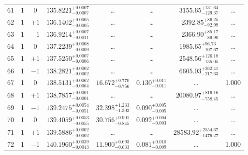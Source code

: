 \begin{table*}[!]
\begin{tabular}{llcrrlrc}
61 & 1 & 0 & $    135.8221_{-      0.0007}^{+      0.0007}$ & \multicolumn{1}{c}{\dots} & \multicolumn{1}{c}{\dots} & $     3155.65_{-      129.37}^{+      131.64}$ & \dots \\[1pt]
62 & 1 & $+1$ & $    136.1402_{-      0.0005}^{+      0.0005}$ & \multicolumn{1}{c}{\dots} & \multicolumn{1}{c}{\dots} & $     2392.85_{-       92.99}^{+       86.25}$ & \dots \\[1pt]
63 & 1 & $-1$ & $    136.9214_{-      0.0011}^{+      0.0007}$ & \multicolumn{1}{c}{\dots} & \multicolumn{1}{c}{\dots} & $     2366.90_{-       89.90}^{+       85.17}$ & \dots \\[1pt]
64 & 1 & 0 & $    137.2239_{-      0.0009}^{+      0.0008}$ & \multicolumn{1}{c}{\dots} & \multicolumn{1}{c}{\dots} & $     1985.65_{-      107.67}^{+       96.73}$ & \dots \\[1pt]
65 & 1 & $+1$ & $    137.5250_{-      0.0006}^{+      0.0007}$ & \multicolumn{1}{c}{\dots} & \multicolumn{1}{c}{\dots} & $     2548.56_{-      135.05}^{+      126.18}$ & \dots \\[1pt]
66 & 1 & $-1$ & $    138.2821_{-      0.0002}^{+      0.0002}$ & \multicolumn{1}{c}{\dots} & \multicolumn{1}{c}{\dots} & $     6605.03_{-      217.63}^{+      262.41}$ & \dots \\[1pt]
67 & 1 & 0 & $    138.5131_{-      0.0064}^{+      0.0062}$ & $      16.672_{-       0.756}^{+       0.770}$ & $       0.130_{-       0.011}^{+       0.011}$ & \multicolumn{1}{c}{\dots} & 1.000\\[1pt]
68 & 1 & $+1$ & $    138.7857_{-      0.0001}^{+      0.0001}$ & \multicolumn{1}{c}{\dots} & \multicolumn{1}{c}{\dots} & $    20080.97_{-      758.45}^{+      816.16}$ & \dots \\[1pt]
69 & 1 & $-1$ & $    139.2475_{-      0.0051}^{+      0.0054}$ & $      32.398_{-       1.303}^{+       1.233}$ & $       0.090_{-       0.005}^{+       0.005}$ & \multicolumn{1}{c}{\dots} & \dots \\[1pt]
70 & 1 & 0 & $    139.4059_{-      0.0055}^{+      0.0053}$ & $      30.756_{-       0.845}^{+       0.901}$ & $       0.092_{-       0.003}^{+       0.004}$ & \multicolumn{1}{c}{\dots} & \dots \\[1pt]
71 & 1 & $+1$ & $    139.5886_{-      0.0002}^{+      0.0002}$ & \multicolumn{1}{c}{\dots} & \multicolumn{1}{c}{\dots} & $    28583.92_{-     1476.27}^{+     2554.67}$ & \dots \\[1pt]
72 & 1 & $-1$ & $    140.1960_{-      0.0043}^{+      0.0039}$ & $      11.900_{-       0.633}^{+       0.693}$ & $       0.081_{-       0.009}^{+       0.010}$ & \multicolumn{1}{c}{\dots} & 1.000\\[1pt]

\end{tabular}
\end{table*}
